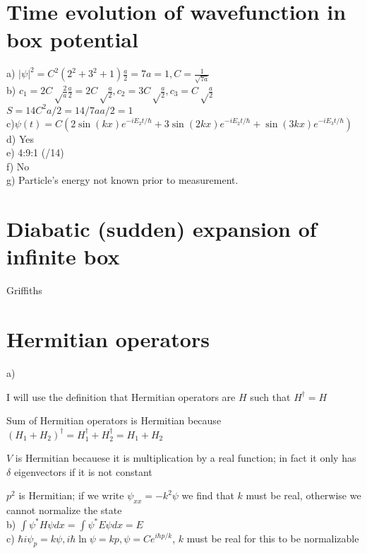 \documentclass{article}
\title{}
\date{}
\newcommand{\<}{\langle}
\renewcommand{\>}{\rangle}
\begin{document}
\maketitle

\section{Time evolution of wavefunction in box potential}

a) $|\psi|^2 = C^2 (2^2 + 3^2 + 1)\frac{a}{2} = 7a = 1, C = \frac{1}{\sqrt{7a}}$
\\
b) $c_1 = 2C\sqrt\frac{2}{a} \frac{a}{2} = 2C\sqrt\frac{a}{2}, c_2 = 3C\sqrt\frac{a}{2}, c_3 = C\sqrt\frac{a}{2}$
\\
$S = 14C^2 a/2 = 14/7a a/2 = 1$
\\
c)$\psi(t) = C(2\sin(kx)e^{-iE_2t/\hbar} + 3\sin(2kx)e^{-iE_2t/\hbar} + \sin(3kx)e^{-iE_3t/\hbar})$
\\
d) Yes
\\
e) 4:9:1 (/14)
\\
f) No
\\
g) Particle's energy not known prior to measurement.

\section{Diabatic (sudden) expansion of infinite box}

Griffiths

\section{Hermitian operators}

a)

I will use the definition that Hermitian operators are $H$ such that $H^\dagger = H$

Sum of Hermitian operators is Hermitian because $(H_1 + H_2)^\dagger = H_1^\dagger + H_2^\dagger = H_1 + H_2$

$V$ is Hermitian becauese it is multiplication by a real function; in fact it only has $\delta$ eigenvectors if it is not constant

$p^2$ is Hermitian; if we write $\psi_{xx} = -k^2\psi$ we find that $k$ must be real, otherwise we cannot normalize the state
\\
b)
$\int \psi^* H \psi dx = \int \psi^* E \psi dx = E$
\\
c)
$\hbar i \psi_p = k\psi, i\hbar \ln \psi = kp, \psi = Ce^{i\hbar p / k}$, $k$ must be real for this to be normalizable
\end{document}
